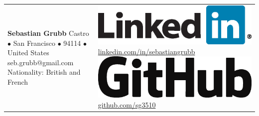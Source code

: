 \documentclass[a4paper,10pt,oneside]{article}
\begin{document}
\begin{tabular}{p{}>{\raggedright}p{}}
\textbf{\huge Sebastian Grubb} \newline
324 Castro  $\bullet$ San Francisco  $\bullet$ 94114 $\bullet$ United States \newline
seb.grubb@gmail.com \newline
Nationality: British and French
&
\includegraphics[scale=.175]{Images/LinkedIn.eps} \newline
\href{http://linkedin.com/in/sebastiangrubb}{linkedin.com/in/sebastiangrubb} \newline
\includegraphics[scale=.075]{Images/GitHub_Logo.eps} \newline
\href{http://github.com/sg3510}{github.com/sg3510}
\end{tabular}








\end{document}
